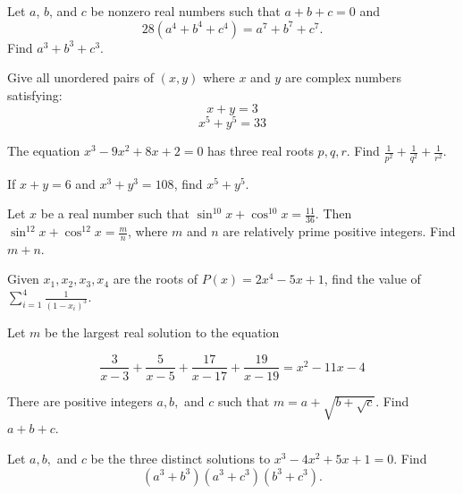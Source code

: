 \documentclass[mast]{lucky}
\begin{document}
\begin{prob}{4}
Let $a$, $b$, and $c$ be nonzero real numbers such that $a+b+c=0$ and \[28(a^4+b^4+c^4) = a^7+b^7+c^7.\] Find $a^3+b^3+c^3$.
\end{prob}

\begin{prob}[]{4}
Give all unordered pairs of $(x,y)$ where $x$ and $y$ are complex numbers satisfying:
$$x+y=3$$
$$x^5+y^5=33$$
\end{prob}

\begin{req}[HMMT 2008]{4}
The equation $x^3-9x^2+8x+2=0$ has three real roots $p,q,r.$ Find $\frac{1}{p^2}+\frac{1}{q^2}+\frac{1}{r^2}.$
\end{req}



\begin{prob}{4}
If $x + y = 6$ and $x^3 + y^3 = 108$, find $x^5 + y^5$.
\end{prob}

\begin{prob}[2019 AIME I]{4}
Let $x$ be a real number such that $\sin^{10} x + \cos^{10}x=\frac{11}{36}$. Then $\sin^{12}x+\cos^{12}x=\frac{m}{n}$, where $m$ and $n$ are relatively prime positive integers. Find $m+n$.
\end{prob}

\begin{prob}{6}

Given $x_1,x_2,x_3,x_4$ are the roots of $P(x)=2x^4-5x+1$, find the value of $\sum_{i=1}^4 \frac{1}{(1-x_i)^3}$.
\end{prob}

\begin{prob}[AIME I 2014/14]{6}

Let $m$ be the largest real solution to the equation

$$ \dfrac{3}{x-3} + \dfrac{5}{x-5} + \dfrac{17}{x-17} + \dfrac{19}{x-19} = x^2 - 11x - 4$$

There are positive integers $a, b,$ and $c$ such that $m = a + \sqrt{b + \sqrt{c}}$. Find $a+b+c$.
\end{prob}

\begin{prob}{6}
Let $a, b,$ and $c$ be the three distinct solutions to $x^{3} - 4x^{2} + 5x + 1 = 0$.
Find $$(a^3+b^3)(a^3+c^3)(b^3+c^3).$$
\end{prob}
\end{document}
